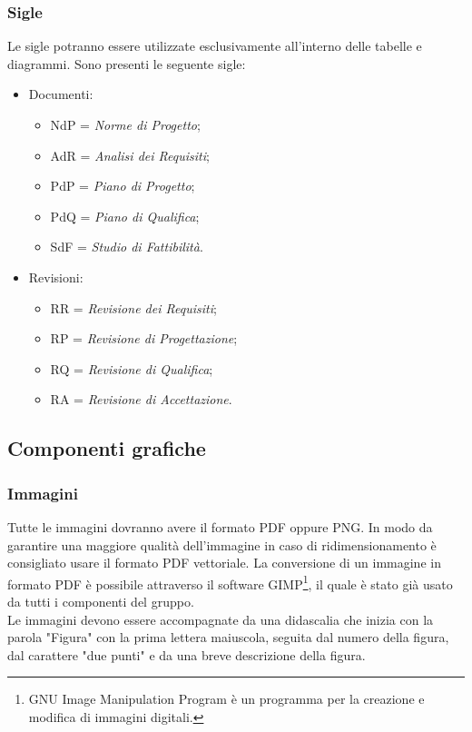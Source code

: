 \subsubsection{Sigle}
Le sigle potranno essere utilizzate esclusivamente all'interno delle tabelle e diagrammi. Sono presenti le seguente sigle: 
\begin{itemize}
	\item Documenti:
	\begin{itemize}
		\item NdP = \textit{Norme di Progetto};
		\item AdR = \textit{Analisi dei Requisiti};
		\item PdP = \textit{Piano di Progetto};
		\item PdQ = \textit{Piano di Qualifica};
		\item SdF = \textit{Studio di Fattibilità}.
	\end{itemize}
	\item Revisioni:
	\begin{itemize}
		\item RR = \textit{Revisione dei Requisiti};
		\item RP = \textit{Revisione di Progettazione};
		\item RQ = \textit{Revisione di Qualifica};
		\item RA = \textit{Revisione di Accettazione}.
	\end{itemize}
\end{itemize}

\subsection{Componenti grafiche}
\subsubsection{Immagini}
Tutte le immagini dovranno avere il formato \gls{PDF} oppure PNG. In modo da garantire una maggiore qualità dell'immagine in caso di ridimensionamento è consigliato usare il formato \gls{PDF} vettoriale. La conversione di un immagine in formato \gls{PDF} è possibile attraverso il software GIMP\footnote{GNU Image Manipulation Program è un programma per la creazione e modifica di immagini digitali.}, il quale è stato già usato da tutti  i componenti del gruppo. \\ Le immagini devono essere accompagnate da una didascalia che inizia con la parola "Figura" con la prima lettera maiuscola, seguita dal numero della figura, dal carattere "due punti" e da una breve descrizione della figura.
